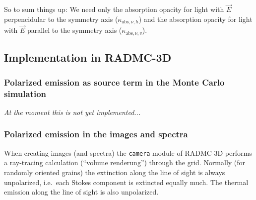 \documentclass{report}
\begin{document}
So to sum things up: We need only the absorption opacity for light with
$\vec E$ perpencidular to the symmetry axis ($\kappa_{\mathrm{abs},\nu,h}$)
and the absorption opacity for light with $\vec E$ parallel to the symmetry
axis ($\kappa_{\mathrm{abs},\nu,v}$).



\subsection{Implementation in RADMC-3D}
\subsubsection{Polarized emission as source term in the Monte Carlo simulation}
{\em At the moment this is not yet implemented...}

\subsubsection{Polarized emission in the images and spectra}
When creating images (and spectra) the {\small\tt camera} module of RADMC-3D
performs a ray-tracing calculation (``volume renderung'') through the grid.
Normally (for randomly oriented grains) the extinction along the line of
sight is always unpolarized, i.e.\ each Stokes component is extincted
equally much. The thermal emission along the line of sight is also
unpolarized. 
\end{document}
